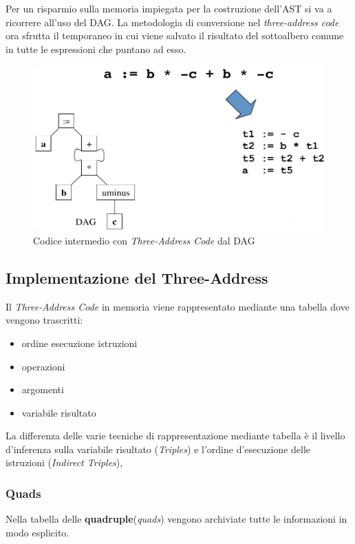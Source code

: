 Per un risparmio sulla memoria impiegata per la costruzione dell'AST si va a
ricorrere all'uso del DAG. La metodologia di conversione nel
\textit{three-address code} ora sfrutta il temporaneo in cui viene salvato il
risultato del sottoalbero comune in tutte le espressioni che puntano ad esso.

\begin{figure}[H]
  \centering
  \includegraphics[scale=0.35]{res/image/tac_dag_rappresentation}
  \caption{Codice intermedio con \textit{Three-Address Code} dal DAG}
  \label{img:tag_dag_rappresentation}
\end{figure}

\subsection{Implementazione del Three-Address}
Il \textit{Three-Address Code} in memoria viene rappresentato mediante una
tabella dove vengono trascritti:
\begin{itemize}
\item ordine esecuzione istruzioni
\item operazioni
\item argomenti
\item variabile risultato
\end{itemize}

La differenza delle varie tecniche di rappresentazione mediante tabella \`e il
livello d'inferenza sulla variabile risultato (\textit{Triples}) e l'ordine
d'esecuzione delle istruzioni (\textit{Indirect Triples}),

\subsubsection{Quads}
Nella tabella delle \textbf{quadruple}(\textit{quads}) vengono archiviate tutte
le informazioni in modo esplicito.

